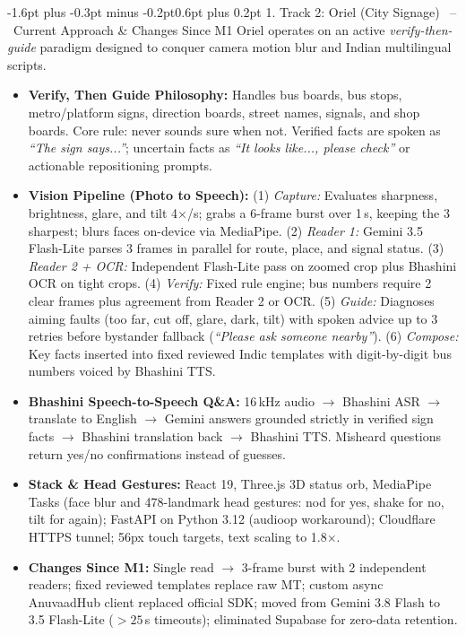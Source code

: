 \documentclass[10pt,a4paper]{article}
\makeatletter
\renewcommand{\section}{\@startsection{section}{1}{\z@}%
  {-1.6pt plus -0.3pt minus -0.2pt}{0.6pt plus 0.2pt}%
  {\normalfont\footnotesize\bfseries\scshape}}
\makeatother
\begin{document}
\section{1. Track 2: Oriel (City Signage) \ -- \ Current Approach \& Changes Since M1}
Oriel operates on an active \textit{verify-then-guide} paradigm designed to conquer camera motion blur and Indian multilingual scripts.
\begin{itemize}\setlength{\itemsep}{0.2pt}\setlength{\topsep}{0.2pt}\setlength{\leftmargin}{1.1em}
  \item \textbf{Verify, Then Guide Philosophy:} Handles bus boards, bus stops, metro/platform signs, direction boards, street names, signals, and shop boards. Core rule: never sounds sure when not. Verified facts are spoken as \textit{``The sign says...''}; uncertain facts as \textit{``It looks like..., please check''} or actionable repositioning prompts.
  \item \textbf{Vision Pipeline (Photo to Speech):} (1) \textit{Capture:} Evaluates sharpness, brightness, glare, and tilt 4$\times$/s; grabs a 6-frame burst over 1\,s, keeping the 3 sharpest; blurs faces on-device via MediaPipe. (2) \textit{Reader 1:} Gemini 3.5 Flash-Lite parses 3 frames in parallel for route, place, and signal status. (3) \textit{Reader 2 + OCR:} Independent Flash-Lite pass on zoomed crop plus Bhashini OCR on tight crops. (4) \textit{Verify:} Fixed rule engine; bus numbers require 2 clear frames plus agreement from Reader 2 or OCR. (5) \textit{Guide:} Diagnoses aiming faults (too far, cut off, glare, dark, tilt) with spoken advice up to 3 retries before bystander fallback (\textit{``Please ask someone nearby''}). (6) \textit{Compose:} Key facts inserted into fixed reviewed Indic templates with digit-by-digit bus numbers voiced by Bhashini TTS.
  \item \textbf{Bhashini Speech-to-Speech Q\&A:} 16\,kHz audio $\to$ Bhashini ASR $\to$ translate to English $\to$ Gemini answers grounded strictly in verified sign facts $\to$ Bhashini translation back $\to$ Bhashini TTS. Misheard questions return yes/no confirmations instead of guesses.
  \item \textbf{Stack \& Head Gestures:} React 19, Three.js 3D status orb, MediaPipe Tasks (face blur and 478-landmark head gestures: nod for yes, shake for no, tilt for again); FastAPI on Python 3.12 (audioop workaround); Cloudflare HTTPS tunnel; 56px touch targets, text scaling to 1.8$\times$.
  \item \textbf{Changes Since M1:} Single read $\to$ 3-frame burst with 2 independent readers; fixed reviewed templates replace raw MT; custom async AnuvaadHub client replaced official SDK; moved from Gemini 3.8 Flash to 3.5 Flash-Lite ($>25$\,s timeouts); eliminated Supabase for zero-data retention.
\end{itemize}
\end{document}
